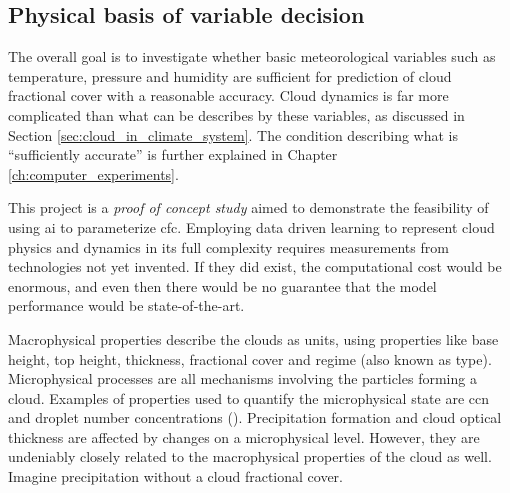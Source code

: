 \subsection{Physical basis of variable decision} \label{sec:ecc}
The overall goal is to investigate whether basic meteorological variables such as temperature, pressure and humidity are sufficient for prediction of cloud fractional cover with a reasonable accuracy. Cloud dynamics is far more complicated than what can be describes by these variables, as discussed in Section \ref{sec:cloud_in_climate_system}.
The condition describing what is ``sufficiently accurate'' is further explained in Chapter \ref{ch:computer_experiments}.

This project is a \textit{proof of concept study} aimed to demonstrate the feasibility of using \acrshort{ai} to parameterize \acrshort{cfc}. Employing data driven learning to represent cloud physics and dynamics in its full complexity requires measurements from technologies not yet invented. If they did exist, the computational cost would be enormous, and even then there would be no guarantee that the model performance would be %
state-of-the-art.

Macrophysical properties describe the clouds as units, using properties like base height, top height, thickness, fractional cover and regime (also known as type). Microphysical processes are all mechanisms involving the particles forming a cloud. Examples of properties used to quantify the microphysical state
are \acrshort{ccn} and droplet number concentrations (\cite{Grabowski2019ModelingBetter}). Precipitation formation and cloud optical thickness are affected by changes on a microphysical level. However, they are undeniably closely related to the macrophysical properties of the cloud as well. Imagine precipitation without a cloud fractional cover. 

